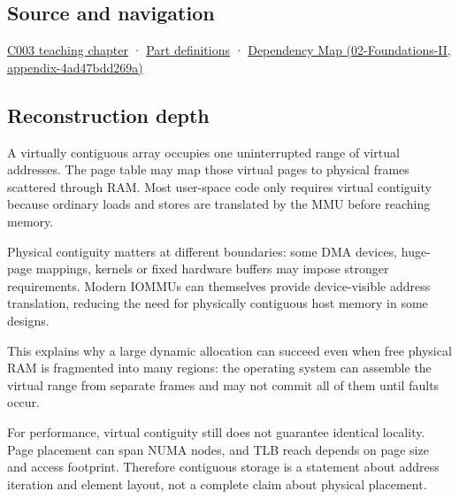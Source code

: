 \subsection{Source and navigation}\label{source-and-navigation}

\href{Continuous\%20Notes/Computing\%20Foundations\%20-\%20From\%20Bits\%20to\%20C++\%20and\%20Systems\%20APIs\#Where\%20the\%20bytes\%20live}{C003 teaching chapter} · \hyperref[appendix-fd090d982a15]{Part definitions} · \href{}{Dependency Map (02-Foundations-II, appendix-4ad47bdd269a)}

\subsection{Reconstruction depth}\label{reconstruction-depth}

A virtually contiguous array occupies one uninterrupted range of virtual addresses. The page table may map those virtual pages to physical frames scattered through RAM. Most user-space code only requires virtual contiguity because ordinary loads and stores are translated by the MMU before reaching memory.

Physical contiguity matters at different boundaries: some DMA devices, huge-page mappings, kernels or fixed hardware buffers may impose stronger requirements. Modern IOMMUs can themselves provide device-visible address translation, reducing the need for physically contiguous host memory in some designs.

This explains why a large dynamic allocation can succeed even when free physical RAM is fragmented into many regions: the operating system can assemble the virtual range from separate frames and may not commit all of them until faults occur.

For performance, virtual contiguity still does not guarantee identical locality. Page placement can span NUMA nodes, and TLB reach depends on page size and access footprint. Therefore contiguous storage is a statement about address iteration and element layout, not a complete claim about physical placement.
